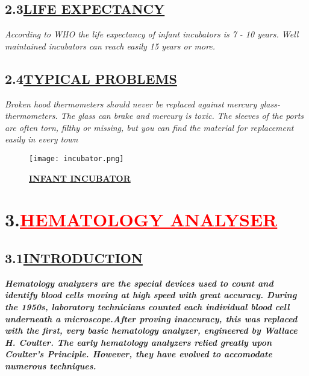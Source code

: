 \documentclass[12pt]{article}
\begin{document}
\subsection*{\hspace{1cm}\textbf{2.3\hspace{1cm}\underline{\LARGE{LIFE EXPECTANCY}}}}
\hspace{2cm}\large{\emph{According to WHO the life expectancy of infant incubators is 7 - 10 years. Well maintained incubators can reach easily 15 years or more.}}
\vspace{1cm}
\subsection*{\hspace{1cm}\textbf{2.4\hspace{1cm}\underline{\LARGE{TYPICAL PROBLEMS}}}}
\hspace{2cm}\large{\emph{Broken hood thermometers should never be replaced against mercury glass-thermometers. The glass can brake and mercury is toxic. The sleeves of the ports are often torn, filthy or missing, but you can find the material for replacement easily in every town}}
\begin{figure}
    \centering
    \texttt{[image: incubator.png]}
    \caption{\textbf{\underline{INFANT INCUBATOR}}}
    \label{fig:2}
\end{figure}
\newpage
\section*{\textbf{3.\hspace{1cm}\textcolor{red}{\underline{\huge{HEMATOLOGY ANALYSER}}}}}
\vspace{1cm}
\subsection*{\hspace{1cm}\textbf{3.1\hspace{1cm}\underline{\LARGE{INTRODUCTION}}}}
\hspace{1cm}\large{\emph{\textbf{Hematology analyzers are the special devices used to count and identify blood cells moving at high speed with great accuracy. During the 1950s, laboratory technicians counted each individual blood cell underneath a microscope.After proving inaccuracy, this was replaced with the first, very basic hematology analyzer, engineered by Wallace H. Coulter. The early hematology analyzers relied greatly upon Coulter's Principle. However, they have evolved to accomodate numerous techniques.}}}
\vspace{2cm}
\end{document}
